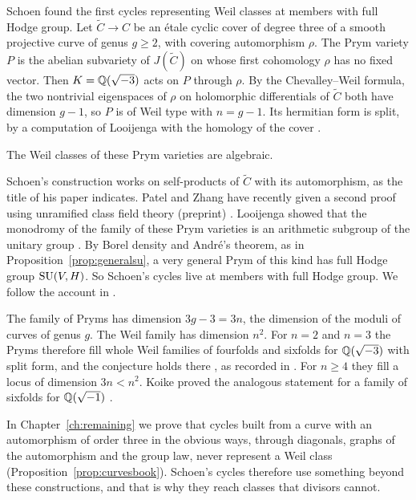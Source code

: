 Schoen found the first cycles representing Weil classes at members with
full Hodge group. Let $\widetilde C\to C$ be an \'etale cyclic cover of degree
three of a smooth projective curve of genus $g\ge2$, with covering
automorphism $\rho$. The Prym variety $P$ is the abelian subvariety of
$J(\widetilde C)$ on whose first cohomology $\rho$ has no fixed vector.
Then $K=\mathbb{Q}(\sqrt{-3})$ acts on $P$ through $\rho$. By the
Chevalley--Weil formula, the two nontrivial eigenspaces of $\rho$ on
holomorphic differentials of $\widetilde C$ both have dimension $g-1$, so $P$
is of Weil type with $n=g-1$. Its hermitian form is split, by a computation
of Looijenga with the homology of the cover \cite{Loo97}.

\begin{theorem}\label{thm:schoen}
The Weil classes of these Prym varieties are algebraic.
\end{theorem}

Schoen's construction works on self-products of $\widetilde C$ with its
automorphism, as the title of his paper indicates. Patel and Zhang have recently given a second proof using unramified class
field theory (preprint) \cite{PZ25}. Looijenga showed that the monodromy of
the family of these Prym varieties is an arithmetic subgroup of the
unitary group \cite{Loo97}. By Borel density and Andr\'e's theorem, as in
Proposition~\ref{prop:generalsu}, a very general Prym of this kind has full
Hodge group $\operatorname{SU}(V,H)$. So Schoen's cycles live at members with full Hodge
group. We follow the account in \cite{BhH8}.

The family of Pryms has dimension $3g-3=3n$, the dimension of the moduli of
curves of genus $g$. The Weil family has dimension $n^{2}$. For $n=2$ and
$n=3$ the Pryms therefore fill whole Weil families of fourfolds and sixfolds
for $\mathbb{Q}(\sqrt{-3})$ with split form, and the conjecture holds there
\cite{Sch88,Sch98}, as recorded in \cite{BhH8}.
For $n\ge4$ they fill a locus of dimension $3n<n^{2}$. Koike proved the
analogous statement for a family of sixfolds for $\mathbb{Q}(\sqrt{-1})$
\cite{Koi04}.

In Chapter~\ref{ch:remaining} we prove that cycles built from a curve with
an automorphism of order three in the obvious ways, through diagonals,
graphs of the automorphism and the group law, never represent a Weil class
(Proposition~\ref{prop:curvesbook}). Schoen's cycles therefore use something
beyond these constructions, and that is why they reach classes that divisors
cannot.

